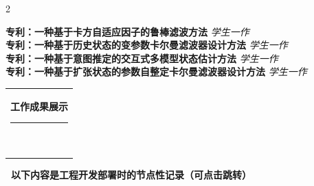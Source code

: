 \documentclass[10pt,A4]{article}
\newcommand{\mpwidth}{\linewidth-\fboxsep-\fboxsep}
\newcommand{\cvtext}[1] {
	\begin{tabular*}{1\mpwidth}{p{0.98\mpwidth}}
		\parbox{1\mpwidth}{#1}
	\end{tabular*}
}
\newcommand{\cvsection}[1] {
	\vspace{14pt}
	\cvtext{
		\textbf{\LARGE{\textcolor{darkcol}{\uppercase{#1}}}}\\[-4pt]
		\textcolor{maincol}{ \rule{0.1\textwidth}{2pt} } \\
	}
}
\begin{document}
\begin{paracol}{2}
\begin{rightcolumn}
\noindent
\normalsize\textbf{专利：一种基于卡方自适应因子的鲁棒滤波方法} \small \hfill \textit{学生一作} \\



\noindent
\normalsize\textbf{专利：一种基于历史状态的变参数卡尔曼滤波器设计方法} \small \hfill \textit{学生一作} \\



\noindent
\normalsize\textbf{专利：一种基于意图推定的交互式多模型状态估计方法} \small \hfill \textit{学生一作} \\


\noindent
\normalsize\textbf{专利：一种基于扩张状态的参数自整定卡尔曼滤波器设计方法} \small \hfill \textit{学生一作} \\




\mbox{}
\vfill
\end{rightcolumn}
\end{paracol}

\newpage
\cvsection{工作成果展示}

\vspace{-2pt}
\begin{center}\small \textbf{\faVideoCamera\ 以下内容是工程开发部署时的节点性记录（可点击跳转）}\end{center}
\end{document}
